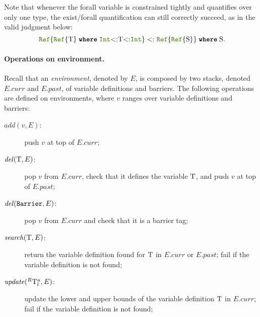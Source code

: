 Note that whenever the forall variable is constrained tightly and
quantifies over only one type, the exist/forall quantification can still
correctly succeed, as in the valid judgment below:
\[ 
  \reftyp{\wheret{\reftyp{\T}}{\inttyp{<:}\T{<:}\inttyp}} <: 
  \wheret{\reftyp{\reftyp{\S}}}{\S}.
\]

\paragraph{Operations on environment.}
Recall that an \emph{environment}, denoted by \(E\),
is composed by two stacks, denoted \(E.curr\) and \(E.past\),
of variable definitions and barriers.
The following operations are
defined on environments, where \(v\)  ranges over variable
definitions and barriers:
\begin{description}
\item[\normalfont\(\mathit{add}(v,E)\):] push \(v\) at top of
  \(E.curr\);
\item[\normalfont\(\mathit{del}(\mathrm{T},E)\):] pop \(v\) from
  \(E.curr\), check that it defines the variable \(\mathrm{T}\), and
  push \(v\) at top of \(E.past\);

\item[\normalfont\(\mathit{del}(\text{\texttt{Barrier}},E)\):] pop \(v\) from
  \(E.curr\) and check that it is a barrier tag;

\item[\normalfont\(\mathit{search}(\mathrm{T},E)\):] return the variable definition
  found for \(\mathrm{T}\) in \(E.curr\) or \(E.past\); fail if
  the variable definition is not found;

\item[\normalfont\(\mathit{update}(^R \mathrm{T}_l^u, E)\):] update the lower
  and upper bounds of the variable definition \(\mathrm{T}\) in
  \(E.curr\); %
  fail if the variable definition is not found;


\end{description}
